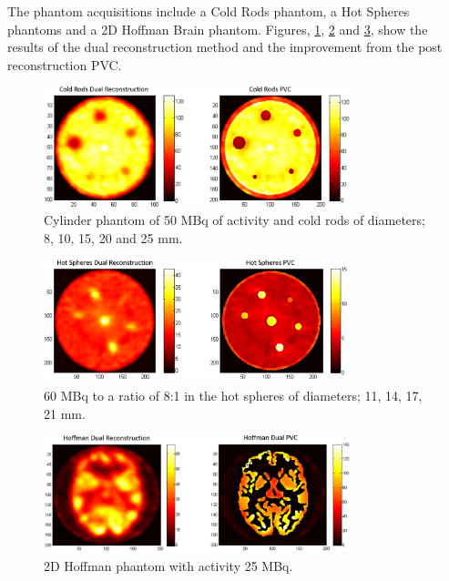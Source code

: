  The phantom acquisitions include a Cold Rods phantom, a Hot Spheres phantoms and a 2D Hoffman Brain phantom. Figures, \ref{fig_cold}, \ref{fig_Hot} and \ref{fig_Hoffman}, show the results of the dual reconstruction method and the improvement from the post reconstruction PVC. 




\begin{figure}[!t]
\centering
\includegraphics[width=3.5in]{figures/ColdRods.png}

\caption{Cylinder phantom of 50 MBq of activity and cold rods of diameters; 8, 10, 15, 20 and 25 mm.}
\label{fig_cold}
\end{figure}

\begin{figure}[!t]
\centering
\includegraphics[width=3.5in]{figures/HotSpheres.png}

\caption{60 MBq to a ratio of 8:1 in the hot spheres of diameters; 11, 14, 17, 21 mm.}
\label{fig_Hot}
\end{figure}

\begin{figure}[!t]
\centering
\includegraphics[width=3.5in]{figures/Hoffman.png}

\caption{2D Hoffman phantom with activity 25 MBq.}
\label{fig_Hoffman}
\end{figure}


